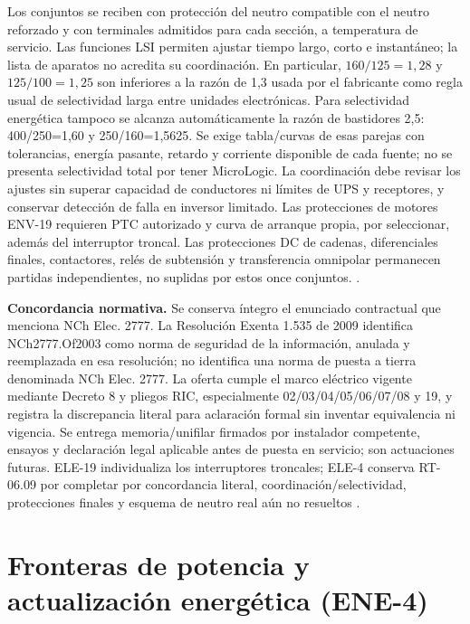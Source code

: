 Los conjuntos se reciben con protección del neutro compatible con el neutro reforzado y con terminales admitidos para cada sección, a temperatura de servicio. Las funciones LSI permiten ajustar tiempo largo, corto e instantáneo; la lista de aparatos no acredita su coordinación. En particular, $160/125=1,28$ y $125/100=1,25$ son inferiores a la razón de 1,3 usada por el fabricante como regla usual de selectividad larga entre unidades electrónicas. Para selectividad energética tampoco se alcanza automáticamente la razón de bastidores 2,5: 400/250=1,60 y 250/160=1,5625. Se exige tabla/curvas de esas parejas con tolerancias, energía pasante, retardo y corriente disponible de cada fuente; no se presenta selectividad total por tener MicroLogic. La coordinación debe revisar los ajustes sin superar capacidad de conductores ni límites de UPS y receptores, y conservar detección de falla en inversor limitado. Las protecciones de motores ENV-19 requieren PTC autorizado y curva de arranque propia, por seleccionar, además del interruptor troncal. Las protecciones DC de cadenas, diferenciales finales, contactores, relés de subtensión y transferencia omnipolar permanecen partidas independientes, no suplidas por estos once conjuntos. \parencite{lote19-schneider-selectividad}.

\textbf{Concordancia normativa.} Se conserva íntegro el enunciado contractual que menciona NCh Elec. 2777. La Resolución Exenta 1.535 de 2009 identifica NCh2777.Of2003 como norma de seguridad de la información, anulada y reemplazada en esa resolución; no identifica una norma de puesta a tierra denominada NCh Elec. 2777. La oferta cumple el marco eléctrico vigente mediante Decreto 8 y pliegos RIC, especialmente 02/03/04/05/06/07/08 y 19, y registra la discrepancia literal para aclaración formal sin inventar equivalencia ni vigencia. Se entrega memoria/unifilar firmados por instalador competente, ensayos y declaración legal aplicable antes de puesta en servicio; son actuaciones futuras. ELE-19 individualiza los interruptores troncales; ELE-4 conserva RT-06.09 por completar por concordancia literal, coordinación/selectividad, protecciones finales y esquema de neutro real aún no resueltos \parencites[art.~2]{lote13-bcn-nch2777}{lote10-sec-ric}.

\section{Fronteras de potencia y actualización energética (ENE-4)}
\label{sec:sd4-energia-ene4}

